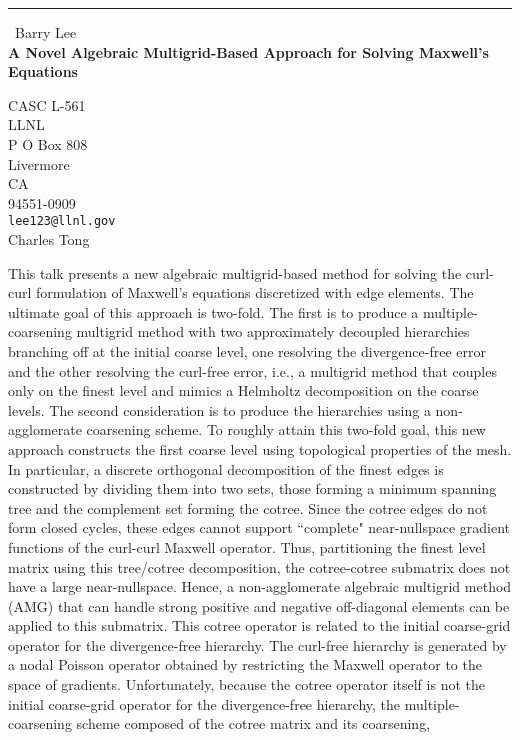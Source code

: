 \documentclass{report}
\begin{document}
\begin{center}
\rule{6in}{1pt} \
{\large Barry Lee \\
{\bf A Novel Algebraic Multigrid-Based Approach for Solving Maxwell's Equations}}

CASC L-561 \\ LLNL \\ P O Box 808 \\ Livermore \\ CA \\ 94551-0909
\\
{\tt lee123@llnl.gov}\\
Charles Tong\end{center}

This talk presents a new algebraic multigrid-based method for solving the
curl-curl formulation of Maxwell's equations discretized with edge elements. The
ultimate goal of this approach is two-fold. The first is to produce a
multiple-coarsening multigrid method with two approximately decoupled
hierarchies branching off at the initial coarse level, one resolving
the divergence-free error and the other resolving the curl-free error, i.e.,
a multigrid method that couples only on the finest level and mimics
a Helmholtz decomposition on the coarse levels. The second consideration
is to produce the hierarchies using a non-agglomerate coarsening scheme. To
roughly attain this two-fold goal, this new approach constructs the
first coarse level using topological properties of the mesh. In particular,
a discrete orthogonal decomposition of the finest edges is constructed by
dividing them into two sets, those forming a minimum spanning tree and the complement
set forming the cotree. Since the cotree edges do not form
closed cycles, these edges cannot support ``complete" near-nullspace gradient
functions of the curl-curl Maxwell operator. Thus, partitioning the finest
level matrix using this tree/cotree decomposition, the cotree-cotree submatrix
does not have a large near-nullspace. Hence, a non-agglomerate algebraic
multigrid method (AMG) that can handle strong positive and negative
off-diagonal elements can be applied to this submatrix. This cotree operator
is related to the initial coarse-grid operator for the divergence-free
hierarchy. The curl-free hierarchy is generated by a nodal Poisson operator
obtained by restricting the Maxwell operator to the space of gradients.
Unfortunately, because the cotree operator itself is not the initial
coarse-grid operator for the divergence-free hierarchy, the
multiple-coarsening scheme composed of the cotree matrix and its coarsening,
\end{document}
